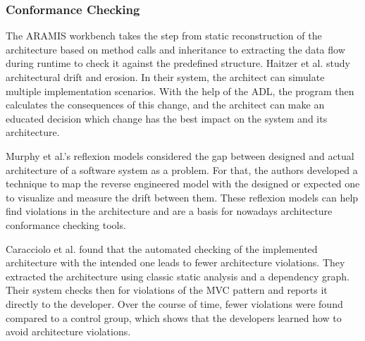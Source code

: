 \documentclass[sigconf, anonymous, review]{acmart}
\begin{document}
\subsubsection{Conformance Checking}

The ARAMIS workbench \cite{Aramis} takes the step from static reconstruction of the architecture based on method calls and inheritance to extracting the data flow during runtime to check it against the predefined structure. 
Haitzer et al. \cite{Arc-Decision} study architectural drift and erosion. In their system, the architect can simulate multiple implementation scenarios. With the help of the ADL, the program then calculates the consequences of this change, and the architect can make an educated decision which change has the best impact on the system and its architecture. 

Murphy et al.'s reflexion models \cite{MurphyRefl} considered the gap between designed and actual architecture of a software system as a problem. For that, the authors developed a technique to map the reverse engineered model with the designed or expected one to visualize and measure the drift between them. These reflexion models can help find violations in the architecture and are a basis for nowadays architecture conformance checking tools. 

Caracciolo et al. \cite{ArcConf} found that the automated checking of the implemented architecture with the intended one leads to fewer architecture violations. They extracted the architecture using classic static analysis and a dependency graph. Their system checks then for violations of the MVC pattern and reports it directly to the developer. Over the course of time, fewer violations were found compared to a control group, which shows that the developers learned how to avoid architecture violations.
\end{document}
